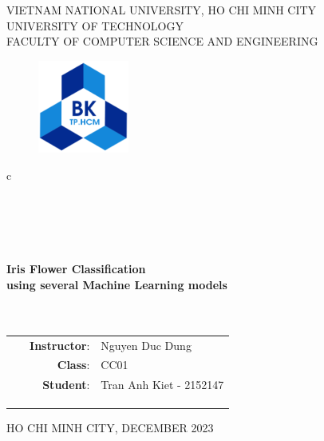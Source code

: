 \documentclass[a4paper]{article}
\begin{document}
\begin{titlepage}
\begin{center}
VIETNAM NATIONAL UNIVERSITY, HO CHI MINH CITY \\
UNIVERSITY OF TECHNOLOGY \\
FACULTY OF COMPUTER SCIENCE AND ENGINEERING
\end{center}

\vspace{1cm}

\begin{figure}[h!]
\begin{center}
\includegraphics[width=3cm]{hcmut.png}
\end{center}
\end{figure}

\vspace{1cm}


\begin{center}
\begin{tabular}{c}
\\
~~\\
\hline
\\
\\\\
\\
\textbf{{\Huge Iris Flower Classification}}\\
\textbf{{\Huge using several Machine Learning models}}\\
\\\\
\hline
\end{tabular}
\end{center}

\vspace{3cm}

\begin{table}[h]
\begin{tabular}{rrl}
\hspace{3 cm} & \textbf{{\ Instructor}}: & Nguyen Duc Dung \\
\hspace{3 cm} & \textbf{{\ Class}}: & CC01  \\
\hspace{3 cm} & \textbf{{\ Student}}: 
& Tran Anh Kiet - 2152147 \\ 
\\

& &   \\
& &   \\
\end{tabular}
\end{table}

\begin{center}
{\footnotesize HO CHI MINH CITY, DECEMBER 2023}
\end{center}
\end{titlepage}
\end{document}
